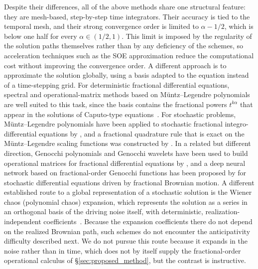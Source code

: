 \documentclass[11pt, a4paper]{article}
\theoremstyle{theoremstyle}
\theoremstyle{definitionstyle}
\begin{document}
Despite their differences, all of the above methods share one structural
feature: they are mesh-based, step-by-step time integrators. Their accuracy is
tied to the temporal mesh, and their strong convergence order is limited to
$\alpha-1/2$, which is below one half for every $\alpha\in(1/2,1)$.
This limit is imposed by the regularity of the solution paths themselves rather
than by any deficiency of the schemes, so acceleration techniques such as the
SOE approximation reduce the computational cost without improving the
convergence order. A different approach is to approximate the solution globally,
using a basis adapted to the equation instead of a time-stepping grid. For
deterministic fractional differential equations, spectral and
operational-matrix methods based on M\"untz--Legendre polynomials are well
suited to this task, since the basis contains the fractional powers
$t^{k\alpha}$ that appear in the solutions of Caputo-type
equations~\cite{mokhtary2016}. For stochastic problems, M\"untz--Legendre
polynomials have been applied to stochastic fractional integro-differential
equations by \cite{singh2022variableorder,singhmehra2023parameter}, and a fractional quadrature rule that is
exact on the M\"untz--Legendre scaling functions was constructed by
\cite{kumari2025fractional}. In a related but different direction, Genocchi
polynomials and Genocchi wavelets have been used to build operational matrices
for fractional differential equations by \cite{isah2016genocchi}, and a deep
neural network based on fractional-order Genocchi functions has been proposed
by \cite{rahimkhani2023numerical} for stochastic differential equations driven
by fractional Brownian motion. A different established route to a global
representation of a stochastic solution is the Wiener chaos (polynomial chaos)
expansion, which represents the solution as a series in an orthogonal basis of
the driving noise itself, with deterministic, realization-independent
coefficients~\cite{cameronmartin1947,houluorozovskiizhou2006}. Because the
expansion coefficients there do not depend on the realized Brownian path, such
schemes do not encounter the anticipativity difficulty described next. We do
not pursue this route because it expands in the noise rather than in time,
which does not by itself supply the fractional-order operational calculus of
\S\ref{sec:proposed_method}, but the contrast is instructive.
\end{document}

